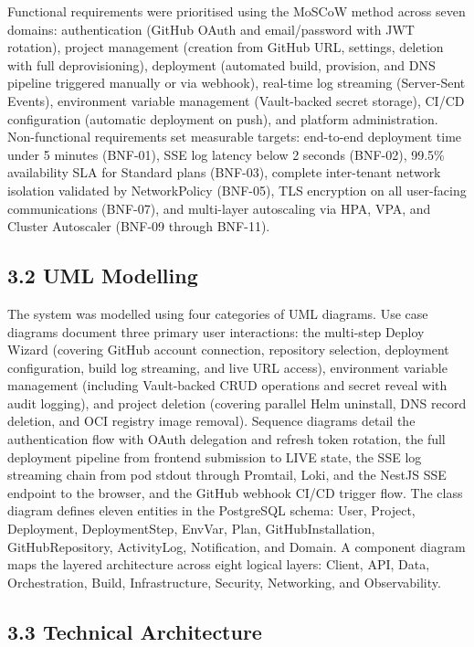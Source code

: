 Functional requirements were prioritised using the MoSCoW method across seven domains: authentication (GitHub OAuth and email/password with JWT rotation), project management (creation from GitHub URL, settings, deletion with full deprovisioning), deployment (automated build, provision, and DNS pipeline triggered manually or via webhook), real-time log streaming (Server-Sent Events), environment variable management (Vault-backed secret storage), CI/CD configuration (automatic deployment on push), and platform administration. Non-functional requirements set measurable targets: end-to-end deployment time under 5 minutes (BNF-01), SSE log latency below 2 seconds (BNF-02), 99.5\% availability SLA for Standard plans (BNF-03), complete inter-tenant network isolation validated by NetworkPolicy (BNF-05), TLS encryption on all user-facing communications (BNF-07), and multi-layer autoscaling via HPA, VPA, and Cluster Autoscaler (BNF-09 through BNF-11).

\subsection*{3.2 UML Modelling}

The system was modelled using four categories of UML diagrams. Use case diagrams document three primary user interactions: the multi-step Deploy Wizard (covering GitHub account connection, repository selection, deployment configuration, build log streaming, and live URL access), environment variable management (including Vault-backed CRUD operations and secret reveal with audit logging), and project deletion (covering parallel Helm uninstall, DNS record deletion, and OCI registry image removal). Sequence diagrams detail the authentication flow with OAuth delegation and refresh token rotation, the full deployment pipeline from frontend submission to LIVE state, the SSE log streaming chain from pod stdout through Promtail, Loki, and the NestJS SSE endpoint to the browser, and the GitHub webhook CI/CD trigger flow. The class diagram defines eleven entities in the PostgreSQL schema: User, Project, Deployment, DeploymentStep, EnvVar, Plan, GitHubInstallation, GitHubRepository, ActivityLog, Notification, and Domain. A component diagram maps the layered architecture across eight logical layers: Client, API, Data, Orchestration, Build, Infrastructure, Security, Networking, and Observability.

\subsection*{3.3 Technical Architecture}

